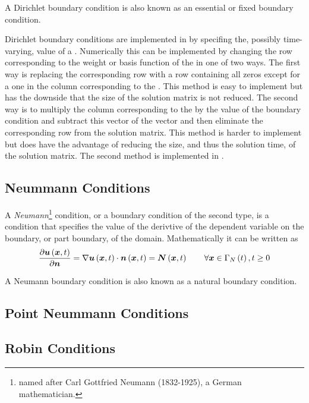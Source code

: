 A Dirichlet boundary condition is also known as an essential or fixed boundary condition.

Dirichlet boundary conditions are implemented in \OpenCMISS by
specifing the, possibly time-varying, value of a \DoF. Numerically
this can be implemented by changing the row corresponding to the
weight or basis function of the \DoF in one of two ways. The first way
is replacing the corresponding row with a row containing all zeros
except for a one in the column corresponding to the \DoF. This method
is easy to implement but has the downside that the size of the
solution matrix is not reduced. The second way is to multiply the
column corresponding to the \DoF by the value of the boundary
condition and subtract this vector of the \RHS vector and then
eliminate the corresponding row from the solution matrix. This method
is harder to implement but does have the advantage of reducing the
size, and thus the solution time, of the solution matrix. The second
method is implemented in \OpenCMISS.

\subsection{Neummann Conditions}
\label{subsec:DevelopersNeumannConditions}

A \emph{Neumann}\footnote{named after Carl Gottfried Neumann (1832-1925), a German mathematician.} condition, or a boundary condition of the second
type, is a condition that specifies the value of the derivtive of the dependent
variable on the boundary, or part boundary, of the
domain. Mathematically it can be written as
\begin{equation}
 \delby{\fnof{\vectr{u}}{\vectr{x},t}}{\vectr{n}}=\dotprod{\gradient{}{\fnof{\vectr{u}}{\vectr{x},t}}}{\fnof{\vectr{n}}{\vectr{x},t}}=\fnof{\vectr{N}}{\vectr{x},t}\qquad\forall\vectr{x}\in\fnof{\Gamma_{N}}{t},t\geq 0
 \label{eqn:DevelopersNeumannCondition}
\end{equation}

A Neumann boundary condition is also known as a natural boundary condition.

\subsection{Point Neummann Conditions}
\label{subsec:DevelopersPointNeumannConditions}

\subsection{Robin Conditions}
\label{subsec:DevelopersRobinConditions}

